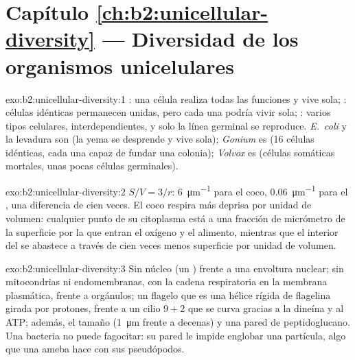 \section*{Capítulo \ref{ch:b2:unicellular-diversity} --- Diversidad de los organismos unicelulares}

\begin{solution}{exo:b2:unicellular-diversity:1}
: una célula realiza todas las funciones y vive sola;
: células idénticas permanecen unidas, pero cada una podría vivir
sola; : varios tipos celulares, interdependientes, y solo la
línea germinal se reproduce. \emph{E.~coli} y la levadura son
 (la yema se desprende y vive sola); \emph{Gonium} es
 (16 células idénticas, cada una capaz de fundar una colonia);
\emph{Volvox} es  (células somáticas mortales, unas pocas
células germinales).
\end{solution}

\begin{solution}{exo:b2:unicellular-diversity:2}
$S/V = 3/r$: \qty{6}{\micro m^{-1}} para el coco,
\qty{0.06}{\micro m^{-1}} para el , una diferencia de cien veces.
El coco respira más deprisa por unidad de volumen: cualquier punto de su
citoplasma está a una fracción de micrómetro de la superficie por la que
entran el oxígeno y el alimento, mientras que el interior del  se
abastece a través de cien veces menos superficie por unidad de volumen.
\end{solution}

\begin{solution}{exo:b2:unicellular-diversity:3}
Sin núcleo (un ) frente a una envoltura nuclear; sin
mitocondrias ni endomembranas, con la cadena respiratoria en la membrana
plasmática, frente a orgánulos; un flagelo que es una hélice rígida de
flagelina girada por protones, frente a un cilio $9+2$ que se curva
gracias a la dineína y al ATP; además, el tamaño (\qty{1}{\micro m}
frente a decenas) y una pared de peptidoglucano. Una bacteria no puede
fagocitar: su pared le impide englobar una partícula, algo que una ameba
hace con sus pseudópodos.
\end{solution}


